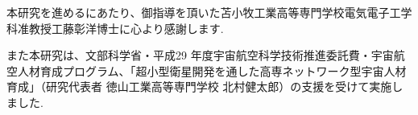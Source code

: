 \begin{acknowledgement}\label{acknowledgement}


本研究を進めるにあたり、御指導を頂いた苫小牧工業高等専門学校電気電子工学科准教授工藤彰洋博士に心より感謝します. 

また本研究は、文部科学省・平成29
年度宇宙航空科学技術推進委託費・宇宙航空人材育成プログラム、「超小型衛星開発を通した高専ネットワーク型宇宙人材育成」（研究代表者
徳山工業高等専門学校 北村健太郎）の支援を受けて実施しました. 

\end{acknowledgement}